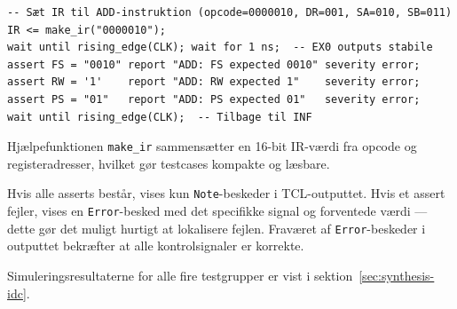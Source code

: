 \documentclass{article}
\begin{document}
\begin{lstlisting}[style=vhdl, caption={Testbench assert-mønster (eksempel: ADD)}, label={lst:idc-tb-pattern}]
-- Sæt IR til ADD-instruktion (opcode=0000010, DR=001, SA=010, SB=011)
IR <= make_ir("0000010");
wait until rising_edge(CLK); wait for 1 ns;  -- EX0 outputs stabile
assert FS = "0010" report "ADD: FS expected 0010" severity error;
assert RW = '1'    report "ADD: RW expected 1"    severity error;
assert PS = "01"   report "ADD: PS expected 01"   severity error;
wait until rising_edge(CLK);  -- Tilbage til INF
\end{lstlisting}

\noindent Hjælpefunktionen \texttt{make\_ir} sammensætter en 16-bit IR-værdi fra opcode og
registeradresser, hvilket gør testcases kompakte og læsbare.

\noindent Hvis alle asserts består, vises kun \texttt{Note}-beskeder i TCL-outputtet.
Hvis et assert fejler, vises en \texttt{Error}-besked med det specifikke signal
og forventede værdi --- dette gør det muligt hurtigt at lokalisere fejlen.
Fraværet af \texttt{Error}-beskeder i outputtet bekræfter at alle kontrolsignaler
er korrekte.

\noindent Simuleringsresultaterne for alle fire testgrupper er vist i sektion~\ref{sec:synthesis-idc}.

\ifdefined\mainfile\else
\end{document}
